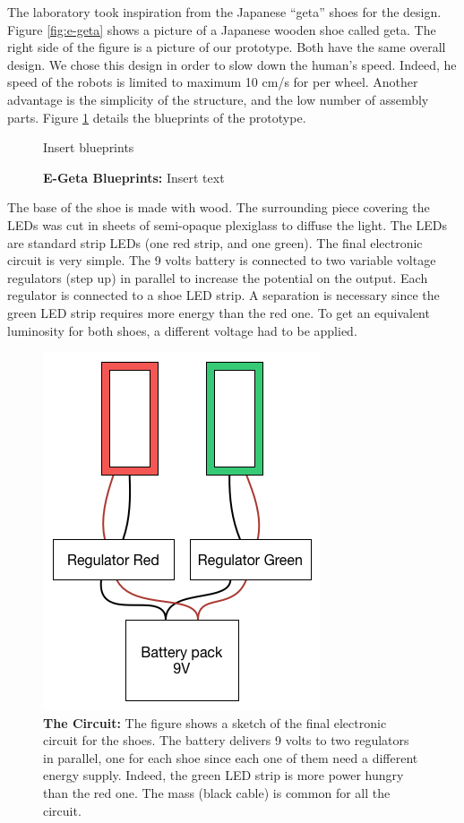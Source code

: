 \documentclass[oneside, a4paper, 12pt]{memoir}
\let\oldCaption\caption
\renewcommand{\caption}[2]{
\oldCaption[#1]{{\small\sffamily\bfseries #1:} #2}
}
\begin{document}
	The laboratory took inspiration from the Japanese \enquote{geta} shoes for the design. Figure \ref{fig:e-geta} shows a picture of a Japanese wooden shoe called geta. The right side of the figure is a picture of our prototype. Both have the same overall design. We chose this design in order to slow down the human's speed. Indeed, he speed of the robots is limited to maximum 10 cm/s for per wheel. Another advantage is the simplicity of the structure, and the low number of assembly parts. Figure \ref{fig:e-geta_blueprints} details the blueprints of the prototype.
	
	\begin{figure}
		Insert blueprints
		
		\caption{E-Geta Blueprints}{Insert text}
		\label{fig:e-geta_blueprints}
	\end{figure}
	
	The base of the shoe is made with wood. The surrounding piece covering the LEDs was cut in sheets of semi-opaque plexiglass to diffuse the light. The LEDs are standard strip LEDs (one red strip, and one green). The final electronic circuit is very simple. The 9 volts battery is connected to two variable voltage regulators (step up) in parallel to increase the potential on the output. Each regulator is connected to a shoe LED strip. A separation is necessary since the green LED strip requires more energy than the red one. To get an equivalent luminosity for both shoes, a different voltage had to be applied.
	
	\begin{figure}\centering
		\includegraphics[scale=0.5]{figures/circuit.png}
		\caption{The Circuit}{The figure shows a sketch of the final electronic circuit for the shoes. The battery delivers 9 volts to two regulators in parallel, one for each shoe since each one of them need a different energy supply. Indeed, the green LED strip is more power hungry than the red one. The mass (black cable) is common for all the circuit.}
	\end{figure}
	
\end{document}

